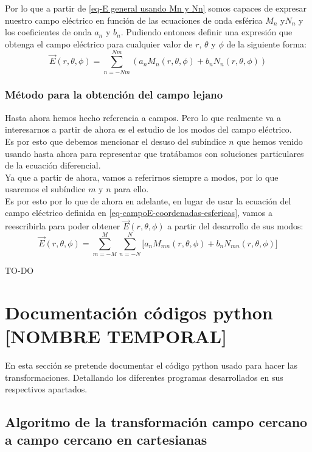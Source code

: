 \documentclass{article}
\begin{document}
Por lo que a partir de \eqref{eq-E general usando Mn y Nn} somos capaces de expresar nuestro campo eléctrico en función de las ecuaciones de onda esférica $M_{n}$ y$N_{n}$ y los coeficientes de onda $a_{n}$ y $b_{n}$. Pudiendo entonces definir una expresión que obtenga el campo eléctrico para cualquier valor de $r$, $\theta$ y $\phi$ de la siguiente forma:
\begin{equation}
\vec{E}(r,\theta,\phi)=\sum_{n=-Nm}^{Nm}(a_{n}M_{n}(r,\theta,\phi)+b_{n}N_{n}(r,\theta,\phi))
\label{eq-campoE-coordenadas-esfericas}
\end{equation}
\newpage
\subsubsection{Método para la obtención del campo lejano}
Hasta ahora hemos hecho referencia a campos. Pero lo que realmente va a interesarnos a partir de ahora es el estudio de los  modos del campo eléctrico.\\
Es por esto que debemos mencionar el desuso  del subíndice  $n$ que hemos venido usando hasta ahora para representar que tratábamos con soluciones particulares de la ecuación diferencial.\\
Ya que a partir de ahora, vamos a referirnos siempre a modos, por lo que usaremos el subíndice $m$ y $n$ para ello.\\

Es por esto por lo que de ahora en adelante, en lugar de usar la ecuación del campo eléctrico definida en \eqref{eq-campoE-coordenadas-esfericas}, vamos a reescribirla para poder obtener $\vec{E}(r,\theta,\phi)$ a partir del desarrollo de sus modos:
\begin{equation}
\vec{E}(r,\theta,\phi)=\sum_{m=-M}^{M}\sum_{n=-N}^{N}\big[a_{n}M_{mn}(r,\theta,\phi)+b_{n}N_{mn}(r,\theta,\phi)\big]
\label{eq-campoE-coordenadas-esfericas-a-partir-de-sus-modos}
\end{equation}

TO-DO

\newpage
\section{Documentación códigos python [NOMBRE TEMPORAL]}

En esta sección se pretende documentar el código python usado para hacer las transformaciones. Detallando los diferentes programas desarrollados en sus respectivos apartados.

\subsection{Algoritmo de la transformación campo cercano a campo cercano en cartesianas}
\label{sec:documentacion codigo NFtoNF}
\end{document}
